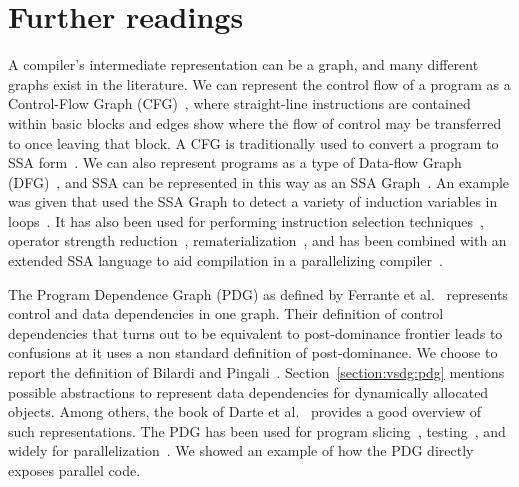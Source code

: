 \section{Further readings}

A compiler's intermediate representation can be a graph, and many different graphs exist in the literature. We can represent the control flow of a program as a Control-Flow Graph (CFG)~\cite{808479}, where straight-line instructions are contained within basic blocks and edges show where the flow of control may be transferred to once leaving that block. A CFG is traditionally used to convert a program to SSA form~\cite{115320}. We can also represent programs as a type of Data-flow Graph (DFG)~\cite{dennis74first,dennis80data}, and SSA can be represented in this way as an SSA Graph~\cite{504710}. An example was given that used the SSA Graph to detect a variety of induction variables in loops~\cite{143131,201003}. It has also been used for performing instruction selection techniques~\cite{1375663,1269857}, operator strength reduction~\cite{504710}, rematerialization~\cite{143143}, and has been combined with an extended SSA language to aid compilation in a parallelizing compiler~\cite{Stoltz_extendedssa}.

The Program Dependence Graph (PDG) as defined by Ferrante et al.~\cite{ferrante87the} represents control and data dependencies in one graph. Their definition of control dependencies that turns out to be equivalent to post-dominance frontier leads to confusions at it uses a non standard definition of post-dominance. We choose to report the definition of Bilardi and Pingali~\cite{Bilardi1996}. Section~\ref{section:vsdg:pdg} mentions possible abstractions to represent data dependencies for dynamically allocated objects. Among others, the book of Darte et al.~\cite{DarteRV-book} provides a good overview of such representations. The PDG has been used for program slicing~\cite{ottenstein84program}, testing~\cite{bates93incremental}, and widely for parallelization~\cite{ferrante85on,ferrante88generating,simons90a,baxter89program}. We showed an example of how the PDG directly exposes parallel code.

